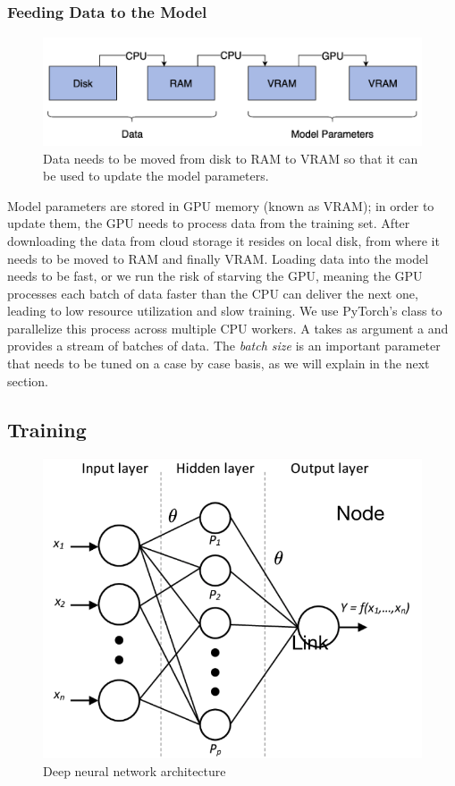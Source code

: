 \subsubsection{Feeding Data to the Model}
\begin{figure}[h]
    \includegraphics[width=\linewidth]{chapters/NLP/figures/ram_cpu_vram.png}
    \caption{Data needs to be moved from disk to RAM to VRAM so that it can be used to update the model parameters.}
    \label{fig:ram_cpu_vram}
\end{figure}
Model parameters are stored in GPU memory (known as VRAM); in order to update them, the GPU needs to process data from the training set.
After downloading the data from cloud storage it resides on local disk, from where it needs to be moved to RAM and finally VRAM.
Loading data into the model needs to be fast, or we run the risk of starving the GPU, meaning the GPU processes each batch of data faster than the CPU can deliver the next one, leading to low resource utilization and slow training.
We use PyTorch's  class to parallelize this process across multiple CPU workers.
A  takes as argument a  and provides a stream of batches of data.
The \textit{batch size} is an important parameter that needs to be tuned on a case by case basis, as we will explain in the next section.

\subsection{Training}
\begin{figure}[h]
    \includegraphics[width=\linewidth]{chapters/NLP/figures/model_architecture.png}
    \caption{Deep neural network architecture}
    \label{fig:model_architecture}
\end{figure}

